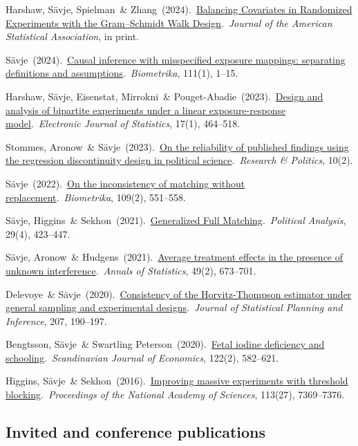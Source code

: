 \documentclass[10pt,letterpaper]{article}
\newenvironment{infolist}{
	\begin{list}{}{
		\setlength{\parskip}{0pt}
		\setlength{\itemsep}{4pt}
		\setlength{\parsep}{0.3em}
		\setlength{\leftmargin}{0em}
		\setlength{\labelwidth}{0em}
		}
	}{
\end{list}
}
\newcommand{\infoitem}[1]{\item {#1}}
\begin{document}
	\begin{infolist}
		\infoitem{Harshaw, Sävje, Spielman\ \& Zhang\ (2024).\ \href{https://doi.org/10.1080/01621459.2023.2285474}{Balancing Covariates in Randomized Experiments with the Gram–Schmidt Walk Design}.\ \textit{Journal of the American Statistical Association}, in print.}
		\infoitem{Sävje\ (2024).\ \href{https://doi.org/10.1093/biomet/asad019}{Causal inference with misspecified exposure mappings: separating definitions and assumptions}.\ \textit{Biometrika}, 111(1), 1--15.}
		\infoitem{Harshaw, Sävje, Eisenstat, Mirrokni\ \& Pouget-Abadie\ (2023).\ \href{https://doi.org/10.1214/23-EJS2111}{Design and analysis of bipartite experiments under a linear exposure-response model}.\ \textit{Electronic Journal of Statistics}, 17(1), 464--518.}
		\infoitem{Stommes, Aronow\ \& Sävje\ (2023).\ \href{https://doi.org/10.1177/20531680231166457}{On the reliability of published findings using the regression discontinuity design in political science}.\ \textit{Research \& Politics}, 10(2).}
		\infoitem{Sävje\ (2022).\ \href{https://doi.org/10.1093/biomet/asab035}{On the inconsistency of matching without replacement}.\ \textit{Biometrika}, 109(2), 551--558.}
		\infoitem{Sävje, Higgins\ \& Sekhon\ (2021).\ \href{https://doi.org/10.1017/pan.2020.32}{Generalized Full Matching}.\ \textit{Political Analysis}, 29(4), 423--447.}
		\infoitem{Sävje, Aronow\ \& Hudgens\ (2021).\ \href{https://projecteuclid.org/journals/annals-of-statistics/volume-49/issue-2/Average-treatment-effects-in-the-presence-of-unknown-interference/10.1214/20-AOS1973.short}{Average treatment effects in the presence of unknown interference}.\ \textit{Annals of Statistics}, 49(2), 673--701.}
		\infoitem{Delevoye\ \& Sävje\ (2020).\ \href{https://www.sciencedirect.com/science/article/pii/S0378375819301211}{Consistency of the Horvitz-Thompson estimator under general sampling and experimental designs}.\ \textit{Journal of Statistical Planning and Inference}, 207, 190--197.}
		\infoitem{Bengtsson, Sävje\ \& Swartling Peterson\ (2020).\ \href{https://onlinelibrary.wiley.com/doi/abs/10.1111/sjoe.12341}{Fetal iodine deficiency and schooling}.\ \textit{Scandinavian Journal of Economics}, 122(2), 582--621.}
		\infoitem{Higgins, Sävje\ \& Sekhon\ (2016).\ \href{https://www.pnas.org/content/113/27/7369}{Improving massive experiments with threshold blocking}.\ \textit{Proceedings of the National Academy of Sciences}, 113(27), 7369--7376.}
	\end{infolist}


	\subsection*{Invited and conference publications}
\end{document}

